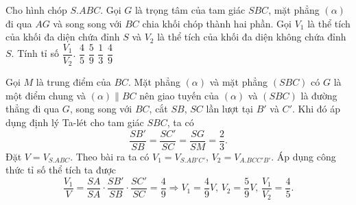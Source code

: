\begin{ex}%
    Cho hình chóp $S.ABC$. Gọi $G$ là trọng tâm của tam giác $SBC$, mặt phẳng $(\alpha)$ đi qua $AG$ và song song với $BC$ chia khối chóp thành hai phần. Gọi $V_1$ là thể tích của khối đa diện chứa đỉnh $S$ và $V_2$ là thể tích của khối đa diện không chứa đỉnh $S$. Tính tỉ số $\dfrac{V_1}{V_2}$.
    \choice
    {\True $\dfrac{4}{5}$}
    {$\dfrac{5}{9}$}
    {$\dfrac{1}{3}$}
    {$\dfrac{4}{9}$}
    \loigiai
    {\immini
        {Gọi $M$ là trung điểm của $BC$. Mặt phẳng $(\alpha)$ và mặt phẳng $(SBC)$ có $G$ là một điểm chung và $(\alpha)\parallel BC$ nên giao tuyến của $(\alpha)$ và $(SBC)$ là đường thẳng đi qua $G$, song song với $BC$, cắt $SB$, $SC$ lần lượt tại $B'$ và $C'$. Khi đó áp dụng định lý Ta-lét cho tam giác $SBC$, ta có
        \[\dfrac{SB'}{SB}=\dfrac{SC'}{SC}=\dfrac{SG}{SM}=\dfrac{2}{3}.\]
    Đặt $V=V_{S.ABC}$. Theo bài ra ta có $V_1=V_{S.AB'C'}$, $V_2=V_{A.BCC'B'}$. Áp dụng công thức tỉ số thể tích ta được
    \[\dfrac{V_1}{V}=\dfrac{SA}{SA}\cdot \dfrac{SB'}{SB}\cdot \dfrac{SC'}{SC}=\dfrac{4}{9} \Rightarrow V_1=\dfrac{4}{9}V,\, V_2=\dfrac{5}{9}V,\, \dfrac{V_1}{V_2}=\dfrac{4}{5}.\]
    }
        {}}
\end{ex}


